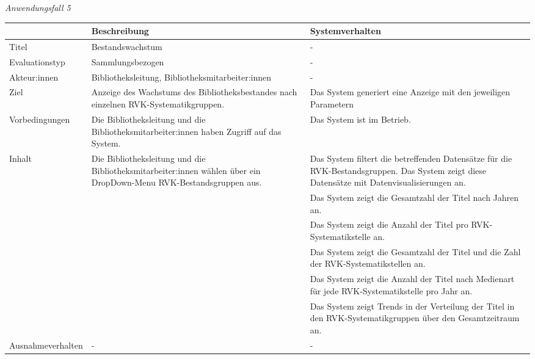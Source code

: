 \newpage
\noindent
\textit{Anwendungsfall 5}

\begingroup
\setlength{\tabcolsep}{10pt} %
\renewcommand{\arraystretch}{1.25} 
\begin{table}[h]
    \centering
    \begin{adjustbox}{max width=\textwidth}
    \begin{tabular}{lp{7.0cm}p{7.0cm}}
       \toprule
       \textbf{}          & \textbf{Beschreibung} &\textbf{Systemverhalten}\\
       \midrule
        Titel                            &Bestandswachstum& -\\
        Evaluationstyp                   &Sammlungsbezogen                   & -\\
        Akteur:innen                     &Bibliotheksleitung, Bibliotheksmitarbeiter:innen& -\\
        Ziel                             &Anzeige des Wachstums des Bibliotheksbestandes nach einzelnen RVK-Systematikgruppen.& Das System generiert eine Anzeige mit den jeweiligen Parametern\\
        Vorbedingungen                   &Die Bibliotheksleitung und die Bibliotheksmitarbeiter:innen haben Zugriff auf das System.& Das System ist im Betrieb.\\
        Inhalt                &Die Bibliotheksleitung und die Bibliotheksmitarbeiter:innen wählen über ein DropDown-Menu RVK-Bestandsgruppen aus.& Das System filtert die betreffenden Datensätze für die RVK-Bestandsgruppen. Das System zeigt diese Datensätze mit Datenvisualisierungen an.\\
                                         & &Das System zeigt die Gesamtzahl der Titel nach Jahren an.\\
                                         & &Das System zeigt die Anzahl der Titel pro RVK-Systematikstelle an.\\
                                         & &Das System zeigt die Gesamtzahl der Titel und die Zahl der RVK-Systematikstellen an.\\
                                         & &Das System zeigt die Anzahl der Titel nach Medienart für jede RVK-Systematikstelle pro Jahr an.\\
                                         & &Das System zeigt Trends in der Verteilung der Titel in den RVK-Systematikgruppen über den Gesamtzeitraum an.\\
        Ausnahmeverhalten               &- & -\\


\end{tabular}
\end{adjustbox}
\end{table}
